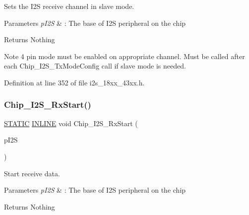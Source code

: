Sets the I2S receive channel in slave mode. 


\begin{DoxyParams}{Parameters}
{\em p\+I2S} & \+: The base of I2S peripheral on the chip \\
\hline
\end{DoxyParams}
\begin{DoxyReturn}{Returns}
Nothing 
\end{DoxyReturn}
\begin{DoxyNote}{Note}
4 pin mode must be enabled on appropriate channel. Must be called after each Chip\+\_\+\+I2\+S\+\_\+\+Tx\+Mode\+Config call if slave mode is needed. 
\end{DoxyNote}


Definition at line 352 of file i2s\+\_\+18xx\+\_\+43xx.\+h.

\mbox{\label{group___i2_s__18_x_x__43_x_x_ga42eb351f08a2dea90fde3ba14d1698e3}} 
\subsubsection{\texorpdfstring{Chip\+\_\+\+I2\+S\+\_\+\+Rx\+Start()}{Chip\_I2S\_RxStart()}}
{\footnotesize\ttfamily \hyperlink{group___l_p_c___types___public___macros_ga10b2d890d871e1489bb02b7e70d9bdfb}{S\+T\+A\+T\+IC} \hyperlink{spifi__18xx__43xx_8h_a2eb6f9e0395b47b8d5e3eeae4fe0c116}{I\+N\+L\+I\+NE} void Chip\+\_\+\+I2\+S\+\_\+\+Rx\+Start (\begin{DoxyParamCaption}\item[{\hyperlink{struct_l_p_c___i2_s___t}{L\+P\+C\+\_\+\+I2\+S\+\_\+T} $\ast$}]{p\+I2S }\end{DoxyParamCaption})}



Start receive data. 


\begin{DoxyParams}{Parameters}
{\em p\+I2S} & \+: The base of I2S peripheral on the chip \\
\hline
\end{DoxyParams}
\begin{DoxyReturn}{Returns}
Nothing 
\end{DoxyReturn}



